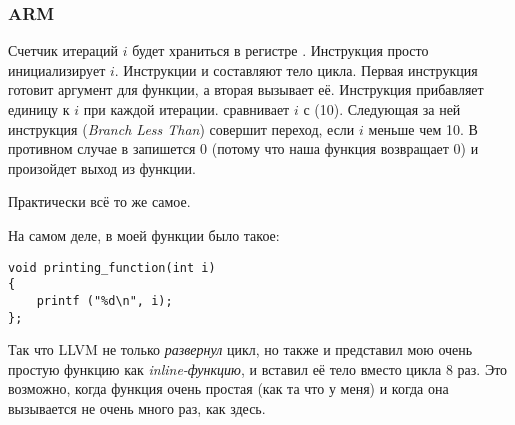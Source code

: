 \subsubsection{ARM}

\myparagraph{\NonOptimizingKeilVI (\ARMMode)}



Счетчик итераций $i$ будет храниться в регистре .
Инструкция  просто инициализирует $i$.
Инструкции  и  составляют тело цикла. 
Первая инструкция готовит аргумент для функции, \ttf а вторая вызывает её.
Инструкция  прибавляет единицу к $i$ при каждой итерации.
 сравнивает $i$ с  (10). 
Следующая за ней инструкция  (\emph{Branch Less Than}) совершит переход, если $i$ меньше чем 10.
В противном случае в  запишется 0 (потому что наша функция возвращает 0) 
и произойдет выход из функции.

\myparagraph{\OptimizingKeilVI (\ThumbMode)}



Практически всё то же самое.

\myparagraph{\OptimizingXcodeIV (\ThumbTwoMode)}
\label{ARM_unrolled_loops}



На самом деле, в моей функции \ttf было такое:

\begin{lstlisting}[style=customc]
void printing_function(int i)
{
    printf ("%d\n", i);
};
\end{lstlisting}

Так что LLVM не только \emph{развернул} цикл, 
но также и представил мою очень простую функцию \ttf как \emph{inline-функцию},
и вставил её тело вместо цикла 8 раз. 
Это возможно, когда функция очень простая (как та что у меня) и когда
она вызывается не очень много раз, как здесь.






